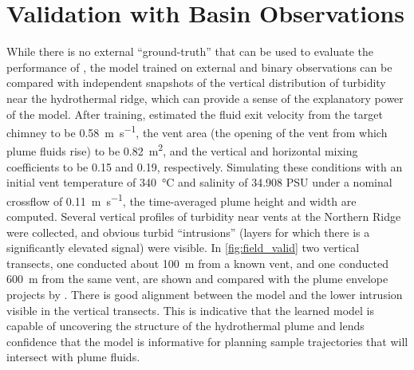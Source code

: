 \section{\PHUMES Validation with Basin Observations}
\label{sec:field_phumes}
While there is no external ``ground-truth'' that can be used to evaluate the performance of \PHORTEX, the \PHUMES model trained on external and binary \Sentry observations can be compared with independent snapshots of the vertical distribution of turbidity near the hydrothermal ridge, which can provide a sense of the explanatory power of the \PHUMES model. After training, \PHUMES estimated the fluid exit velocity from the target chimney to be \SI{0.58}{\meter\per\second}, the vent area (the opening of the vent from which plume fluids rise) to be \SI{0.82}{\meter\squared}, and the vertical and horizontal mixing coefficients to be 0.15 and 0.19, respectively. Simulating these conditions with an initial vent temperature of \SI{340}{\celsius} and salinity of 34.908 PSU under a nominal crossflow of \SI{0.11}{\meter\per\second}, the time-averaged plume height and width are computed. Several vertical profiles of turbidity near vents at the Northern Ridge were collected, and obvious turbid ``intrusions'' (layers for which there is a significantly elevated signal) were visible. In \cref{fig:field_valid} two vertical transects, one conducted about \SI{100}{\meter} from a known vent, and one conducted \SI{600}{\meter} from the same vent, are shown and compared with the plume envelope projects by \PHUMES. There is good alignment between the model and the lower intrusion visible in the vertical transects. This is indicative that the learned \PHUMES model is capable of uncovering the structure of the hydrothermal plume and lends confidence that the model is informative for planning sample trajectories that will intersect with plume fluids.

